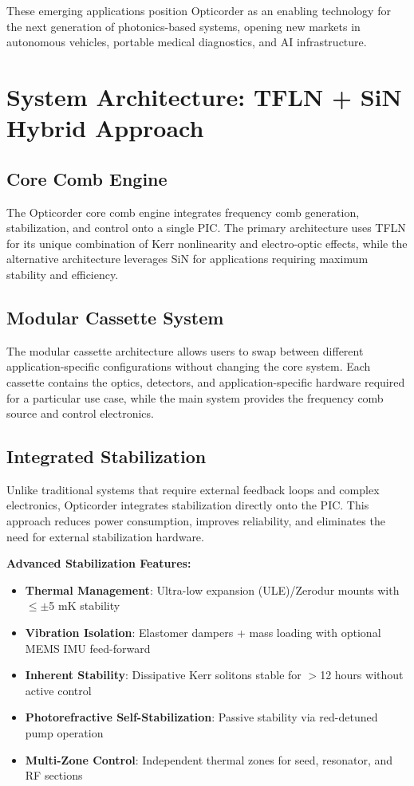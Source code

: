 \documentclass[11pt,a4paper]{article}
\begin{document}
These emerging applications position Opticorder as an enabling technology for the next generation of photonics-based systems, opening new markets in autonomous vehicles, portable medical diagnostics, and AI infrastructure.

\section{System Architecture: TFLN + SiN Hybrid Approach}

\subsection{Core Comb Engine}
The Opticorder core comb engine integrates frequency comb generation, stabilization, and control onto a single PIC. The primary architecture uses TFLN for its unique combination of Kerr nonlinearity and electro-optic effects, while the alternative architecture leverages SiN for applications requiring maximum stability and efficiency.

\subsection{Modular Cassette System}
The modular cassette architecture allows users to swap between different application-specific configurations without changing the core system. Each cassette contains the optics, detectors, and application-specific hardware required for a particular use case, while the main system provides the frequency comb source and control electronics.

\subsection{Integrated Stabilization}
Unlike traditional systems that require external feedback loops and complex electronics, Opticorder integrates stabilization directly onto the PIC. This approach reduces power consumption, improves reliability, and eliminates the need for external stabilization hardware.

\textbf{Advanced Stabilization Features:}
\begin{itemize}
\item \textbf{Thermal Management}: Ultra-low expansion (ULE)/Zerodur mounts with $\leq\pm$5 mK stability
\item \textbf{Vibration Isolation}: Elastomer dampers + mass loading with optional MEMS IMU feed-forward
\item \textbf{Inherent Stability}: Dissipative Kerr solitons stable for $>$12 hours without active control
\item \textbf{Photorefractive Self-Stabilization}: Passive stability via red-detuned pump operation
\item \textbf{Multi-Zone Control}: Independent thermal zones for seed, resonator, and RF sections
\end{itemize}
\end{document}

